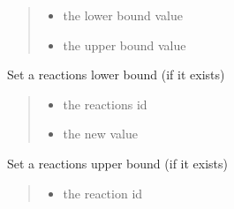 \documentclass[letterpaper,12pt,english]{sphinxmanual}
\begin{document}
\begin{fulllineitems}
\begin{fulllineitems}
\begin{quote}
\begin{description}
\begin{itemize}
\item {} 
\sphinxAtStartPar
{} \textendash{} the lower bound value

\item {} 
\sphinxAtStartPar
{} \textendash{} the upper bound value

\end{itemize}

\end{description}\end{quote}

\end{fulllineitems}


\begin{fulllineitems}
\label{\detokenize{api/core:cbmpy.CBModel.Model.setReactionLowerBound}}
\pysigstartsignatures
\pysiglinewithargsret
{}
{\sphinxparamcomma {}}
{}
\pysigstopsignatures
\sphinxAtStartPar
Set a reactions lower bound (if it exists)
\begin{quote}\begin{description}
\begin{itemize}
\item {} 
\sphinxAtStartPar
{} \textendash{} the reactions id

\item {} 
\sphinxAtStartPar
{} \textendash{} the new value

\end{itemize}

\end{description}\end{quote}

\end{fulllineitems}


\begin{fulllineitems}
\label{\detokenize{api/core:cbmpy.CBModel.Model.setReactionUpperBound}}
\pysigstartsignatures
\pysiglinewithargsret
{}
{\sphinxparamcomma {}}
{}
\pysigstopsignatures
\sphinxAtStartPar
Set a reactions upper bound (if it exists)
\begin{quote}\begin{description}
\begin{itemize}
\item {} 
\sphinxAtStartPar
{} \textendash{} the reaction id


\end{itemize}
\end{description}
\end{quote}
\end{fulllineitems}
\end{fulllineitems}
\end{document}
